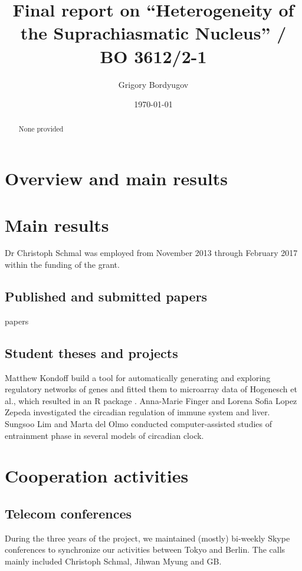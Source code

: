 \documentclass[a4paper]{article}
\title{Final report on ``Heterogeneity of the Suprachiasmatic
Nucleus'' / BO 3612/2-1}
\author{Grigory Bordyugov \mailhref{grigory.bordyugov@gmail.com}}
\date{\today}
\begin{document}
\maketitle

\begin{abstract}
  None provided
\end{abstract}

\tableofcontents

\section{Overview and main results}

\section{Main results}
Dr Christoph Schmal was employed from November 2013 through February
2017 within the funding of the grant.

\subsection{Published and submitted papers}
papers
\cite{bordyugov2015tuning,schmal2015theoretical,kondoff2015modeling,schmal2017moran,wagner2017plant,myung2017choroid,schmal2017measuring}

\subsection{Student theses and projects}
Matthew Kondoff build a tool for automatically generating and
exploring regulatory networks of genes and fitted them to microarray
data of Hogenesch et al., which resulted in an R package
\cite{kondoff2015modeling}. Anna-Marie Finger and Lorena Sofia Lopez
Zepeda investigated the circadian regulation of immune system and
liver.  Sungsoo Lim and Marta del Olmo conducted computer-assisted
studies of entrainment phase in several models of circadian clock.



\section{Cooperation activities}

\subsection{Telecom conferences}
During the three years of the project, we maintained (mostly)
bi-weekly Skype conferences to synchronize our activities between
Tokyo and Berlin. The calls mainly included Christoph Schmal, Jihwan
Myung and GB.
\end{document}
